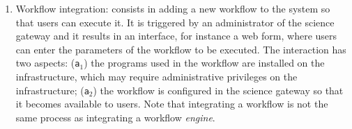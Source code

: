 \documentclass[preprint,3p,twocolumn]{elsarticle}
\begin{document}
\begin{enumerate}[leftmargin=0cm,itemindent=0.65cm,label=\texttt{(\alph*)}]

\item Workflow integration: consists in adding a new workflow to the
  system so that users can execute it. It is triggered by an
  administrator of the science gateway and it results in an interface,
  for instance a web form, where users can enter the parameters of the
  workflow to be executed. The interaction has two aspects:
  (\texttt{a$_1$}) the programs used in the workflow are installed on
  the infrastructure, which may require administrative privileges on
  the infrastructure; (\texttt{a$_2$}) the workflow is configured in
  the science gateway so that it becomes available to users. Note that
  integrating a workflow is not the same process as integrating a
  workflow \emph{engine}.
  

\end{enumerate}
\end{document}
